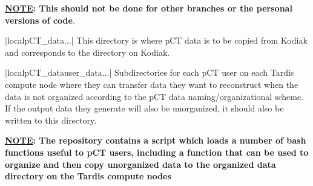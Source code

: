 \begin{tcbenvironment}
\begin{tcbparbox}
\textbf{\ul{NOTE}: This should not be done for other branches or the personal versions of code}.
\end{tcbparbox}
\begin{tcbparbox}|\dirsep local\dirsep pCT\_data\dirsep$\dots$|
\bfdash This directory is where pCT data is to be copied from Kodiak and corresponds to the  directory on Kodiak.
\end{tcbparbox}
\begin{tcbparbox}|\dirsep local\dirsep pCT\_data\dirsep user\_data\dirsep{}\dirsep$\dots$|
\bfdash Subdirectories for each pCT user on each Tardis compute node where they can transfer data they want to reconstruct when the data is not organized according to the pCT data naming/organizational scheme.  If the output data they generate will also be unorganized, it should also be written to this directory.\\\par

\textbf{\ul{NOTE}: The  repository contains a script which loads a number of bash functions useful to pCT users, including a function that can be used to organize and then copy unorganized data to the organized data directory on the Tardis compute nodes}
\end{tcbparbox}
\end{tcbenvironment}
\endinput 